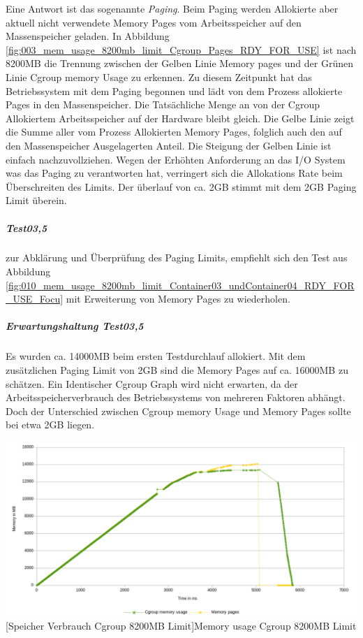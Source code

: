 Eine Antwort ist das sogenannte  \glqq{}\emph{Paging}\grqq{}. Beim Paging werden Allokierte aber aktuell nicht verwendete Memory Pages vom Arbeitsspeicher auf den Massenspeicher geladen. In Abbildung \ref{fig:003_mem_usage_8200mb_limit_Cgroup_Pages_RDY_FOR_USE} ist nach 8200MB die Trennung zwischen der Gelben Linie \glqq{}Memory pages\grqq{} und der Grünen Linie \glqq{}Cgroup memory Usage\grqq{} zu erkennen. Zu diesem Zeitpunkt hat das Betriebssystem mit dem Paging begonnen und lädt von dem Prozess allokierte Pages in den Massenspeicher. Die Tatsächliche Menge an von der Cgroup Allokiertem Arbeitsspeicher auf der Hardware bleibt gleich. Die Gelbe Linie zeigt die Summe aller vom Prozess Allokierten Memory Pages, folglich auch den auf den Massenspeicher Ausgelagerten Anteil. Die Steigung der Gelben Linie ist einfach nachzuvollziehen. Wegen der Erhöhten Anforderung an das I/O System was das Paging zu verantworten hat, verringert sich die Allokations Rate beim Überschreiten des Limits. Der überlauf von ca. 2GB stimmt mit dem 2GB Paging Limit überein.

\subparagraph{Test03,5}
zur Abklärung und Überprüfung des Paging Limits, empfiehlt sich den Test aus Abbildung \ref{fig:010_mem_usage_8200mb_limit_Container03_undContainer04_RDY_FOR_USE_Focu} mit Erweiterung von Memory Pages zu wiederholen.

\subparagraph{Erwartungshaltung Test03,5}
Es wurden ca. 14000MB beim ersten Testdurchlauf allokiert. Mit dem zusätzlichen Paging Limit von 2GB sind die Memory Pages auf ca. 16000MB zu schätzen. Ein Identischer Cgroup Graph wird nicht erwarten, da der Arbeitsspeicherverbrauch des Betriebssystems von mehreren Faktoren abhängt. Doch der Unterschied zwischen Cgroup memory Usage und Memory Pages sollte bei etwa 2GB liegen. 

\vspace{1em}
\begin{minipage}{\linewidth}
	\centering
	\includegraphics[width=1\linewidth]{pics/001,5_mem_usage_No_Limit_Cgroup_Pages_RDY_FOR_USE.png}
	[Speicher Verbrauch Cgroup 8200MB Limit]{Memory usage Cgroup 8200MB Limit}
	\label{fig:001,5_mem_usage_No_Limit_Cgroup_Pages_RDY_FOR_USE.png}
\end{minipage}

